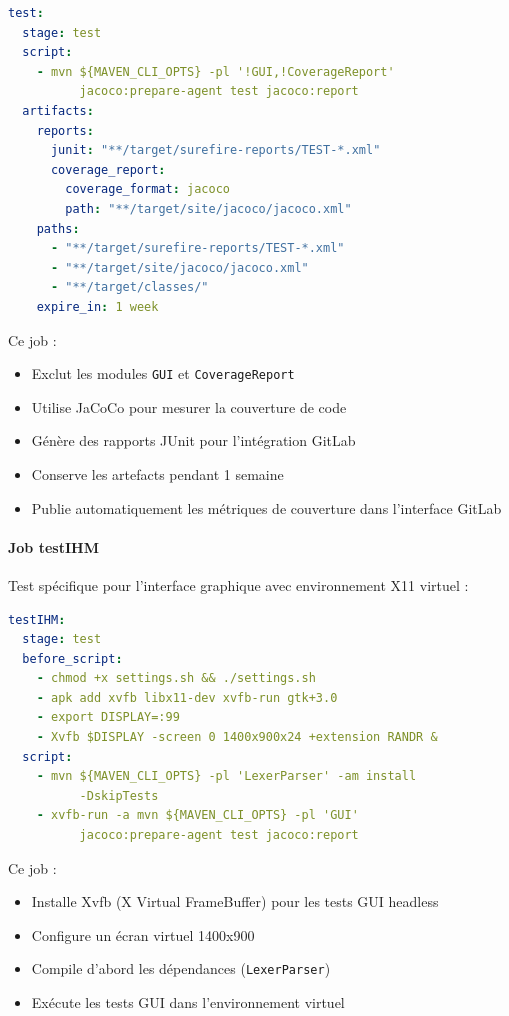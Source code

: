 \vspace{0.3cm}
\begin{lstlisting}[language=yaml, caption=Job de test]
test:
  stage: test
  script:
    - mvn ${MAVEN_CLI_OPTS} -pl '!GUI,!CoverageReport'
          jacoco:prepare-agent test jacoco:report
  artifacts:
    reports:
      junit: "**/target/surefire-reports/TEST-*.xml"
      coverage_report:
        coverage_format: jacoco
        path: "**/target/site/jacoco/jacoco.xml"
    paths:
      - "**/target/surefire-reports/TEST-*.xml"
      - "**/target/site/jacoco/jacoco.xml"
      - "**/target/classes/"
    expire_in: 1 week
\end{lstlisting}

Ce job :
\begin{itemize}
    \item Exclut les modules \texttt{GUI} et \texttt{CoverageReport}
    \item Utilise JaCoCo pour mesurer la couverture de code
    \item Génère des rapports JUnit pour l'intégration GitLab
    \item Conserve les artefacts pendant 1 semaine
    \item Publie automatiquement les métriques de couverture dans l'interface GitLab
\end{itemize}

\paragraph{Job testIHM}

Test spécifique pour l'interface graphique avec environnement X11 virtuel :

\vspace{0.3cm}
\begin{lstlisting}[language=yaml, caption=Job de test IHM avec Xvfb]
testIHM:
  stage: test
  before_script:
    - chmod +x settings.sh && ./settings.sh
    - apk add xvfb libx11-dev xvfb-run gtk+3.0
    - export DISPLAY=:99
    - Xvfb $DISPLAY -screen 0 1400x900x24 +extension RANDR &
  script:
    - mvn ${MAVEN_CLI_OPTS} -pl 'LexerParser' -am install
          -DskipTests
    - xvfb-run -a mvn ${MAVEN_CLI_OPTS} -pl 'GUI'
          jacoco:prepare-agent test jacoco:report
\end{lstlisting}

Ce job :
\begin{itemize}
    \item Installe Xvfb (X Virtual FrameBuffer) pour les tests GUI headless
    \item Configure un écran virtuel 1400x900
    \item Compile d'abord les dépendances (\texttt{LexerParser})
    \item Exécute les tests GUI dans l'environnement virtuel
\end{itemize}


